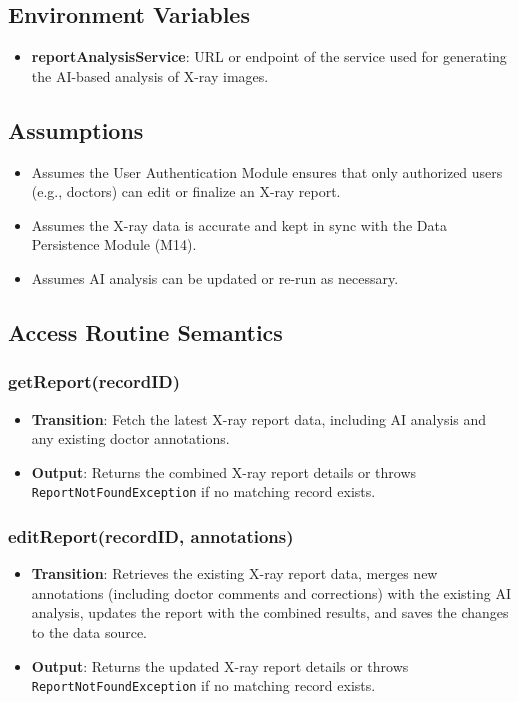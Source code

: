 \documentclass[12pt, titlepage]{article}
\begin{document}
\subsection{Environment Variables}
\begin{itemize}
  \item \textbf{reportAnalysisService}: URL or endpoint of the service used for generating the AI-based analysis of X-ray images.
\end{itemize}

\subsection{Assumptions}
\begin{itemize}
  \item Assumes the User Authentication Module ensures that only authorized users (e.g., doctors) can edit or finalize an X-ray report.
  \item Assumes the X-ray data is accurate and kept in sync with the Data Persistence Module (M14).
  \item Assumes AI analysis can be updated or re-run as necessary.
\end{itemize}

\subsection{Access Routine Semantics}

\subsubsection{getReport(recordID)}
\begin{itemize}
  \item \textbf{Transition}:  Fetch the latest X-ray report data, including AI analysis and any existing doctor annotations.
  \item \textbf{Output}: Returns the combined X-ray report details or throws \texttt{ReportNotFoundException} if no matching record exists.
\end{itemize}

\subsubsection{editReport(recordID, annotations)}
\begin{itemize}
  \item \textbf{Transition}: Retrieves the existing X-ray report data, merges new annotations (including doctor comments and corrections) with the existing AI analysis, updates the report with the combined results, and saves the changes to the data source.
  \item \textbf{Output}: Returns the updated X-ray report details or throws \texttt{ReportNotFoundException} if no matching record exists.
\end{itemize}
\end{document}
